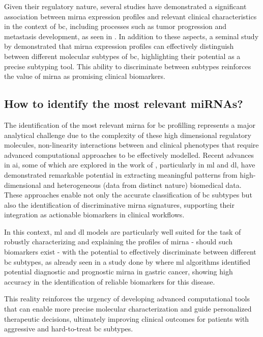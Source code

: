 Given their regulatory nature, several studies have demonstrated a significant
association between \gls{mirna} expression profiles and relevant clinical
characteristics in the context of \gls{bc}, including processes such as tumor
progression and metastasis development, as seen in
\cite{mirna_as_biomarkers_Ho2022, _Mendes2022Nanodelivery,
  mirnas_in_bc_Muñoz2023}. In addition to these aspects, a seminal study by
\textcite{mirna_as_bio_for_sub_Blenkiron2007MicroRNA} demonstrated that
\gls{mirna} expression profiles can effectively distinguish between different
molecular subtypes of \gls{bc}, highlighting their potential as a precise
subtyping tool. This ability to discriminate between subtypes reinforces the
value of \gls{mirna} as promising clinical biomarkers.

\subsection{How to identify the most relevant miRNAs?}

The identification of the most relevant \gls{mirna} for \gls{bc} profilling
represents a major analytical challenge due to the complexity of these high
dimensional regulatory molecules, non-linearity interactions between and
clinical phenotypes that require advanced computational approaches to be
effectively modelled. Recent advances in \gls{ai}, some of which are explored
in the work of \textcite{ml_for_microRNA_Luo2023MachineLearning}, particularly
in \gls{ml} and \gls{dl}, have demonstrated remarkable potential in extracting
meaningful patterns from high-dimensional and heterogeneous (data from distinct
nature) biomedical data. These approaches enable not only the accurate
classification of \gls{bc} subtypes but also the identification of
discriminative \gls{mirna} signatures, supporting their integration as
actionable biomarkers in clinical workflows.

In this context, \gls{ml} and \gls{dl} models are particularly well suited for
the task of robustly characterizing and explaining the profiles of \gls{mirna}
- should such biomarkers exist - with the potential to effectively discriminate
between different \gls{bc} subtypes, as already seen in a study done by
\textcite{ml_gastric_Azari2023} where \gls{ml} algorithms identified potential
diagnostic and prognostic \gls{mirna} in gastric cancer, showing high accuracy
in the identification of reliable biomarkers for this disease.

This reality reinforces the urgency of developing advanced computational tools
that can enable more precise molecular characterization and guide personalized
therapeutic decisions, ultimately improving clinical outcomes for patients with
aggressive and hard-to-treat \gls{bc} subtypes.

